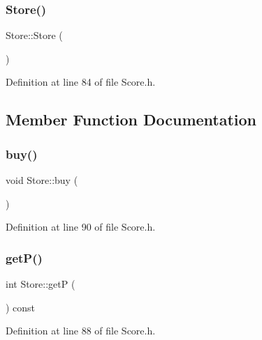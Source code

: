 \subsubsection{\texorpdfstring{Store()}{Store()}}
{\footnotesize\ttfamily Store\+::\+Store (\begin{DoxyParamCaption}{ }\end{DoxyParamCaption})\hspace{0.3cm}{\ttfamily [inline]}}



Definition at line 84 of file Score.\+h.



\subsection{Member Function Documentation}
\hypertarget{class_store_ad1d0cf3b358c21e26f2c357040330847}{}\label{class_store_ad1d0cf3b358c21e26f2c357040330847} 
\subsubsection{\texorpdfstring{buy()}{buy()}}
{\footnotesize\ttfamily void Store\+::buy (\begin{DoxyParamCaption}{ }\end{DoxyParamCaption})\hspace{0.3cm}{\ttfamily [inline]}}



Definition at line 90 of file Score.\+h.

\hypertarget{class_store_a1aac09e876734e5b27994dbd220b07fe}{}\label{class_store_a1aac09e876734e5b27994dbd220b07fe} 
\subsubsection{\texorpdfstring{get\+P()}{getP()}}
{\footnotesize\ttfamily int Store\+::getP (\begin{DoxyParamCaption}{ }\end{DoxyParamCaption}) const\hspace{0.3cm}{\ttfamily [inline]}}



Definition at line 88 of file Score.\+h.

\hypertarget{class_store_a6ed77ae11cd2e113b4865b16d7478fbc}{}\label{class_store_a6ed77ae11cd2e113b4865b16d7478fbc} 
